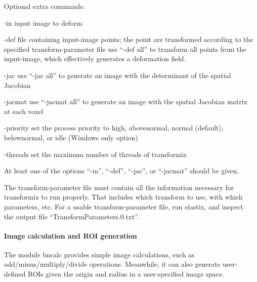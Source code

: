\documentclass[letterpaper,10pt,english]{sphinxmanual}
\begin{document}
Optional extra commands:
\begin{optionlist}{3cm}
\item [-in]  
input image to deform
\item [-def]  
file containing input-image points; the point are transformed
according to the specified transform-parameter file
use ``-def all'' to transform all points from the input-image, which
effectively generates a deformation field.
\item [-jac]  
use ``-jac all'' to generate an image with the determinant of the
spatial Jacobian
\item [-jacmat]  
use ``-jacmat all'' to generate an image with the spatial Jacobian
matrix at each voxel
\item [-priority]  
set the process priority to high, abovenormal, normal (default),
belownormal, or idle (Windows only option)
\item [-threads]  
set the maximum number of threads of transformix
\end{optionlist}

At least one of the options ``-in'', ``-def'', ``-jac'', or ``-jacmat'' should be given.

The transform-parameter file must contain all the information necessary for transformix to run properly. That includes which transform to use, with which parameters, etc. For a usable transform-parameter file, run elastix, and inspect the output file ``TransformParameters.0.txt''.


\paragraph{Image calculation and ROI generation}
\label{userguide:image-calculation-and-roi-generation}
The module bncalc provides simple image calculations, such as add/minus/multiply/divide operations. Meanwhile, it can also generate user-defined ROIs given the origin and radius in a user-specified image space.
\end{document}

